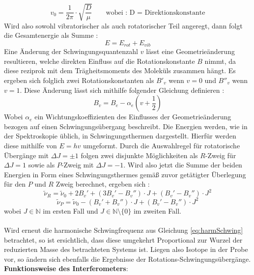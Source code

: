 \begin{equation}
v_0 = \frac{1}{2\pi} \cdot \sqrt{\frac{D}{\mu}} \quad\quad \text{wobei : D = Direktionskonstante}
\label{eq:harmSchwing}
\end{equation}Wird also sowohl vibratorischer als auch rotatorischer Teil angeregt, dann folgt die Gesamtenergie als Summe :
\begin{equation}
E = E_{rot} + E_{vib}
\end{equation}
Eine Änderung der Schwingungsquantenzahl $v$ lässt eine Geometrieänderung resultieren, welche direkten Einfluss auf die Rotationskonstante $B$ nimmt, da diese reziprok mit dem Trägheitsmoments des Moleküls zusammen hängt. Es ergeben sich folglich zwei Rotationskonstanten als $B'_v$ wenn $v=0$ und $B''_v$ wenn $v=1$. Diese Änderung lässt sich mithilfe folgender Gleichung definieren :
\begin{equation}
B_v = B_e - \alpha_e(v+\frac{1}{2})
\end{equation}
Wobei $\alpha_e$ ein Wichtungskoeffizienten des Einflusses der Geometrieänderung bezogen auf einen Schwingungsübergang beschreibt. Die Energien werden, wie in der Spektroskopie üblich, in Schwingungsthermen dargestellt. Hierfür werden diese mithilfe von $E=hv$ umgeformt. Durch die Auswahlregel für rotatorische Übergänge mit $\Delta J = \pm 1$ folgen zwei disjunkte Möglichkeiten als $R$-Zweig für $\Delta J=1$ sowie als $P$-Zweig mit $\Delta J=-1$. Wird also jetzt die Summe der beiden Energien in Form eines Schwingungsthermes gemäß zuvor getätigter Überlegung für den $P$ und $R$ Zweig berechnet, ergeben sich :
\begin{equation}
\tilde{\nu}_R = \tilde{\nu}_0 + 2B_v' + (3B_v'-B_v'')\cdot J +(B_v'-B_v'')\cdot J^2
\end{equation}
\begin{equation}
\tilde{\nu}_P = \tilde{\nu}_0 -(B_v'+ B_v'')\cdot J +(B_v'-B_v'')\cdot J^2
\end{equation}
wobei $J \in \mathbb{N}$ im ersten Fall und $J \in \mathbb{N}\setminus\{0\}$ im zweiten Fall.
\\
\\
Wird erneut die harmonische Schwingfrequenz aus Gleichung \ref{eq:harmSchwing} betrachtet, so ist ersichtlich, dass diese umgekehrt Proportional zur Wurzel der reduzierten Masse des betrachteten Systems ist. Liegen also Isotope in der Probe vor, so ändern sich ebenfalls die Ergebnisse der Rotations-Schwingungsübergänge. \\
\newpage
\textbf{Funktionsweise des Interferometers}:\\
